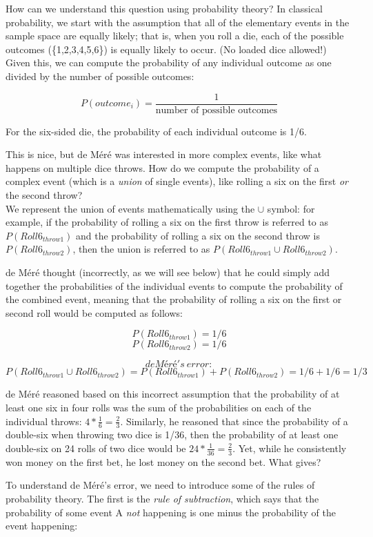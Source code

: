 \documentclass[12pt,]{book}
\theoremstyle{definition}
\theoremstyle{definition}
\theoremstyle{definition}
\theoremstyle{remark}
\begin{document}
How can we understand this question using probability theory? In classical probability, we start with the assumption that all of the elementary events in the sample space are equally likely; that is, when you roll a die, each of the possible outcomes (\{1,2,3,4,5,6\}) is equally likely to occur. (No loaded dice allowed!) Given this, we can compute the probability of any individual outcome as one divided by the number of possible outcomes:

\[
P(outcome_i) = \frac{1}{\text{number of possible outcomes}}
\]

For the six-sided die, the probability of each individual outcome is 1/6.

This is nice, but de Méré was interested in more complex events, like what happens on multiple dice throws. How do we compute the probability of a complex event (which is a \emph{union} of single events), like rolling a six on the first \emph{or} the second throw?\\
We represent the union of events mathematically using the \(\cup\) symbol: for example, if the probability of rolling a six on the first throw is referred to as \(P(Roll6_{throw1})\) and the probability of rolling a six on the second throw is \(P(Roll6_{throw2})\), then the union is referred to as \(P(Roll6_{throw1} \cup Roll6_{throw2})\).

de Méré thought (incorrectly, as we will see below) that he could simply add together the probabilities of the individual events to compute the probability of the combined event, meaning that the probability of rolling a six on the first or second roll would be computed as follows:

\[
P(Roll6_{throw1}) = 1/6
\]
\[
P(Roll6_{throw2}) = 1/6
\]

\[
de Méré's \ error:
\]
\[
P(Roll6_{throw1} \cup Roll6_{throw2}) = P(Roll6_{throw1}) + P(Roll6_{throw2}) = 1/6 + 1/6 = 1/3
\]

de Méré reasoned based on this incorrect assumption that the probability of at least one six in four rolls was the sum of the probabilities on each of the individual throws: \(4*\frac{1}{6}=\frac{2}{3}\). Similarly, he reasoned that since the probability of a double-six when throwing two dice is 1/36, then the probability of at least one double-six on 24 rolls of two dice would be \(24*\frac{1}{36}=\frac{2}{3}\). Yet, while he consistently won money on the first bet, he lost money on the second bet. What gives?

To understand de Méré's error, we need to introduce some of the rules of probability theory. The first is the \emph{rule of subtraction}, which says that the probability of some event A \emph{not} happening is one minus the probability of the event happening:
\end{document}
